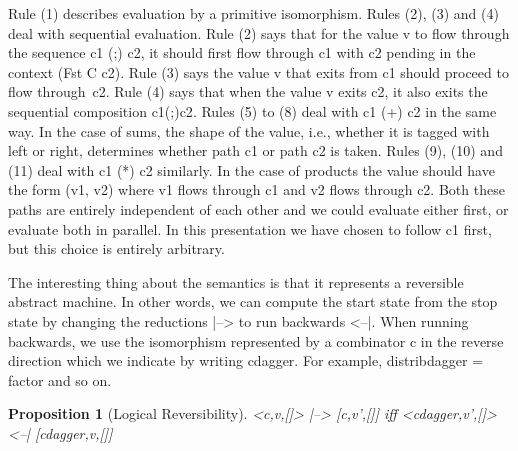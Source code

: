 \documentclass[preprint]{sigplanconf}
\newtheorem{proposition}[theorem]{Proposition}
\begin{document}
\begin{scriptsize}
\end{scriptsize}
Rule (1) describes evaluation by a primitive isomorphism. Rules (2), (3) and
(4) deal with sequential evaluation. Rule (2) says that for the value {{v}}
to flow through the sequence {{c1 (;) c2}}, it should first flow through
{{c1}} with {{c2}} pending in the context ({{Fst C c2}}). Rule (3) says the
value {{v}} that exits from {{c1}} should proceed to flow
through~{{c2}}. Rule (4) says that when the value {{v}} exits {{c2}}, it also
exits the sequential composition {{c1(;)c2}}. Rules (5) to (8) deal with 
{{c1 (+) c2}} in the same way. In the case of sums, the shape of the value,
i.e., whether it is tagged with {{left}} or {{right}}, determines whether
path {{c1}} or path {{c2}} is taken. Rules (9), (10) and (11) deal with 
{{c1 (*) c2}} similarly. In the case of products the value should have the
form {{(v1, v2)}} where {{v1}} flows through {{c1}} and {{v2}} flows through
{{c2}}. Both these paths are entirely independent of each other and we could
evaluate either first, or evaluate both in parallel. In this presentation we
have chosen to follow {{c1}} first, but this choice is entirely arbitrary.

The interesting thing about the semantics is that it represents a reversible
abstract machine. In other words, we can compute the start state from the
stop state by changing the reductions {{|-->}} to run backwards
{{<--|}}. When running backwards, we use the isomorphism represented by a
combinator {{c}} in the reverse direction which we indicate by writing
{{c{dagger}}}. For example, {{distrib{dagger} = factor}} and so on.

\begin{proposition}[Logical Reversibility]
\label{prop:logrev}
{{<c,v,[]> |--> [c,v',[]]}} iff 
{{<c{dagger},v',[]> <--| [c{dagger},v,[]]}} 
\end{proposition}
\end{document}
